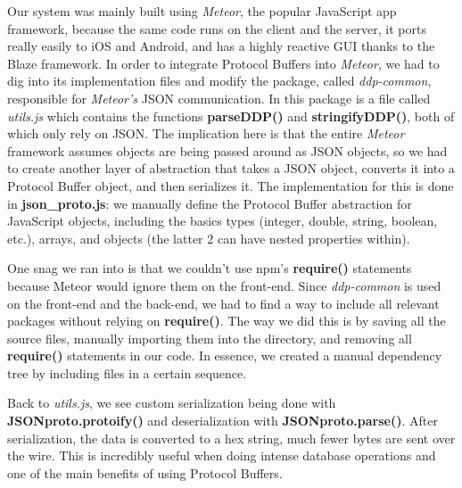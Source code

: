 \documentclass[11pt]{article} %
\begin{document}
%
%

Our system was mainly built using \textit{Meteor}, the popular JavaScript app framework, because the same code runs on the client and the server, it ports really easily to iOS and Android, and has a highly reactive GUI thanks to the Blaze framework. In order to integrate Protocol Buffers into \textit{Meteor}, we had to dig into its implementation files and modify the package, called \textit{ddp-common}, responsible for \textit{Meteor's} JSON communication. In this package is a file called \textit{utils.js} which contains the functions \textbf{parseDDP()} and \textbf{stringifyDDP()}, both of which only rely on JSON. The implication here is that the entire \textit{Meteor} framework assumes objects are being passed around as JSON objects, so we had to create another layer of abstraction that takes a JSON object, converts it into a Protocol Buffer object, and then serializes it. The implementation for this is done in \textbf{json\_proto.js}: we manually define the Protocol Buffer abstraction for JavaScript objects, including the basics types (integer, double, string, boolean, etc.), arrays, and objects (the latter 2 can have nested properties within). 

One snag we ran into is that we couldn't use npm's \textbf{require()} statements because Meteor would ignore them on the front-end. Since \textit{ddp-common} is used on the front-end and the back-end, we had to find a way to include all relevant packages without relying on \textbf{require()}. The way we did this is by saving all the source files, manually importing them into the directory, and removing all \textbf{require()} statements in our code. In essence, we created a manual dependency tree by including files in a certain sequence. 

Back to \textit{utils.js}, we see custom serialization being done with \textbf{JSONproto.protoify()} and deserialization with \textbf{JSONproto.parse()}. After serialization, the data is converted to a hex string, much fewer bytes are sent over the wire. This is incredibly useful when doing intense database operations and one of the main benefits of using Protocol Buffers.
\end{document}
